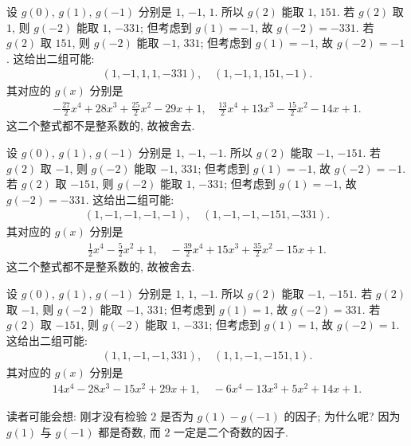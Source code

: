 \begin{example}
    设 $g(0)$, $g(1)$, $g(-1)$ 分别是 $1$, $-1$, $1$. 所以 $g(2)$ 能取 $1$, $151$. 若 $g(2)$ 取 $1$, 则 $g(-2)$ 能取 $1$, $-331$; 但考虑到 $g(1) = -1$, 故 $g(-2) = -331$. 若 $g(2)$ 取 $151$, 则 $g(-2)$ 能取 $-1$, $331$; 但考虑到 $g(1) = -1$, 故 $g(-2) = -1$. 这给出二组可能:
    \begin{align*}
        (1,-1,1,1,-331), \quad (1,-1,1,151,-1).
    \end{align*}
    其对应的 $g(x)$ 分别是
    \begin{align*}
        -\frac{27}{2} x^4+28 x^3+\frac{25}{2} x^2-29 x+1, \quad \frac{13}{2} x^4+13 x^3-\frac{15}{2} x^2-14 x+1.
    \end{align*}
    这二个整式都不是整系数的, 故被舍去.

    设 $g(0)$, $g(1)$, $g(-1)$ 分别是 $1$, $-1$, $-1$. 所以 $g(2)$ 能取 $-1$, $-151$. 若 $g(2)$ 取 $-1$, 则 $g(-2)$ 能取 $-1$, $331$; 但考虑到 $g(1) = -1$, 故 $g(-2) = -1$. 若 $g(2)$ 取 $-151$, 则 $g(-2)$ 能取 $1$, $-331$; 但考虑到 $g(1) = -1$, 故 $g(-2) = -331$. 这给出二组可能:
    \begin{align*}
        (1,-1,-1,-1,-1), \quad (1,-1,-1,-151,-331).
    \end{align*}
    其对应的 $g(x)$ 分别是
    \begin{align*}
        \frac{1}{2} x^4-\frac{5}{2} x^2+1, \quad -\frac{39}{2} x^4+15 x^3+\frac{35}{2} x^2-15 x+1.
    \end{align*}
    这二个整式都不是整系数的, 故被舍去.

    设 $g(0)$, $g(1)$, $g(-1)$ 分别是 $1$, $1$, $-1$. 所以 $g(2)$ 能取 $-1$, $-151$. 若 $g(2)$ 取 $-1$, 则 $g(-2)$ 能取 $-1$, $331$; 但考虑到 $g(1) = 1$, 故 $g(-2) = 331$. 若 $g(2)$ 取 $-151$, 则 $g(-2)$ 能取 $1$, $-331$; 但考虑到 $g(1) = 1$, 故 $g(-2) = 1$. 这给出二组可能:
    \begin{align*}
        (1,1,-1,-1,331), \quad (1,1,-1,-151,1).
    \end{align*}
    其对应的 $g(x)$ 分别是
    \begin{align*}
        14 x^4-28 x^3-15 x^2+29 x+1, \quad -6 x^4-13 x^3+5 x^2+14 x+1.
    \end{align*}

    读者可能会想: 刚才没有检验 $2$ 是否为 $g(1) - g(-1)$ 的因子; 为什么呢? 因为 $g(1)$ 与 $g(-1)$ 都是奇数, 而 $2$ 一定是二个奇数的因子.


\end{example}
